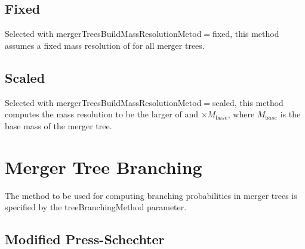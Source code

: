 \subsection{Fixed}

Selected with {\normalfont \ttfamily mergerTreesBuildMassResolutionMetod}$=${\normalfont \ttfamily fixed}, this method assumes a fixed mass resolution of {\normalfont \ttfamily [mergerTreeBuildMassResolutionFixed]} for all merger trees.

\subsection{Scaled}

Selected with {\normalfont \ttfamily mergerTreesBuildMassResolutionMetod}$=${\normalfont \ttfamily scaled}, this method computes the mass resolution to be the larger of {\normalfont \ttfamily [mergerTreeBuildMassResolutionScaledMinimum]} and {\normalfont \ttfamily [mergerTreeBuildMassResolutionScaledFraction]}$\times M_{\mathrm base}$, where $M_{\mathrm base}$ is the base mass of the merger tree.

\section{Merger Tree Branching}

The method to be used for computing branching probabilities in merger trees is specified by the {\normalfont \ttfamily treeBranchingMethod} parameter.

\subsection{Modified Press-Schechter}

